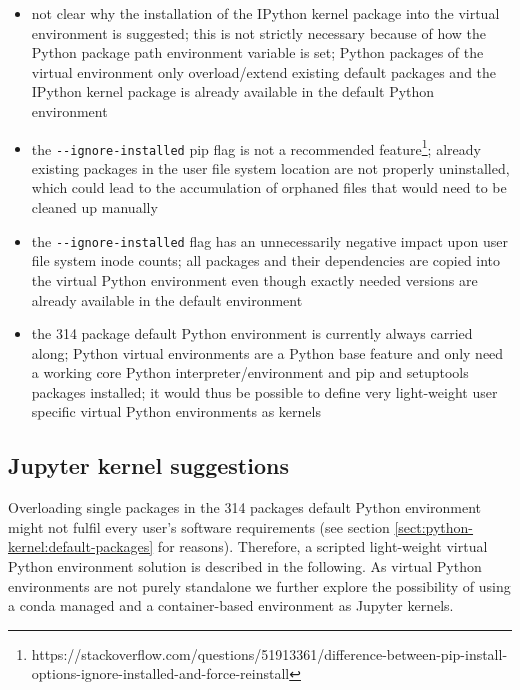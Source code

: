 \documentclass[11pt,a4paper]{article}
\begin{document}
\begin{itemize}

\item not clear why the installation of the IPython kernel package into the virtual environment is suggested;
this is not strictly necessary because of how the Python package path environment variable is set;
Python packages of the virtual environment only overload/extend existing default packages and the IPython kernel package is already available in the default Python environment

\item the \verb|--ignore-installed| pip flag is not a recommended feature\footnote{https://stackoverflow.com/questions/51913361/difference-between-pip-install-options-ignore-installed-and-force-reinstall};
already existing packages in the user file system location are not properly uninstalled, which could lead to the accumulation of orphaned files that would need to be cleaned up manually

\item the \verb|--ignore-installed| flag has an unnecessarily negative impact upon user file system inode counts;
all packages and their dependencies are copied into the virtual Python environment even though exactly needed versions are already available in the default environment

\item the 314 package default Python environment is currently always carried along;
Python virtual environments are a Python base feature and only need a working core Python interpreter/environment and pip and setuptools packages installed;
it would thus be possible to define very light-weight user specific virtual Python environments as kernels

\end{itemize}

\subsection{Jupyter kernel suggestions}
\label{sect:jupyter-kernel-suggestions}

Overloading single packages in the 314 packages default Python environment might not fulfil every user's software requirements (see section \ref{sect:python-kernel:default-packages} for reasons).
Therefore, a scripted light-weight virtual Python environment solution is described in the following.
As virtual Python environments are not purely standalone we further explore the possibility of using a conda managed and a container-based environment as Jupyter kernels.
\end{document}

